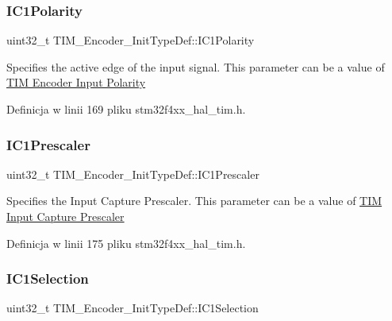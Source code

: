 \subsubsection{\texorpdfstring{I\+C1\+Polarity}{IC1Polarity}}
{\footnotesize\ttfamily uint32\+\_\+t T\+I\+M\+\_\+\+Encoder\+\_\+\+Init\+Type\+Def\+::\+I\+C1\+Polarity}

Specifies the active edge of the input signal. This parameter can be a value of \hyperlink{group___t_i_m___encoder___input___polarity}{T\+IM Encoder Input Polarity} 

Definicja w linii 169 pliku stm32f4xx\+\_\+hal\+\_\+tim.\+h.

\mbox{\label{struct_t_i_m___encoder___init_type_def_a56307eb4766e3f0e1cd1cd3c4fc2157e}} 
\subsubsection{\texorpdfstring{I\+C1\+Prescaler}{IC1Prescaler}}
{\footnotesize\ttfamily uint32\+\_\+t T\+I\+M\+\_\+\+Encoder\+\_\+\+Init\+Type\+Def\+::\+I\+C1\+Prescaler}

Specifies the Input Capture Prescaler. This parameter can be a value of \hyperlink{group___t_i_m___input___capture___prescaler}{T\+IM Input Capture Prescaler} 

Definicja w linii 175 pliku stm32f4xx\+\_\+hal\+\_\+tim.\+h.

\mbox{\label{struct_t_i_m___encoder___init_type_def_a85fbdebacff594ff1ad0d16eddfdc179}} 
\subsubsection{\texorpdfstring{I\+C1\+Selection}{IC1Selection}}
{\footnotesize\ttfamily uint32\+\_\+t T\+I\+M\+\_\+\+Encoder\+\_\+\+Init\+Type\+Def\+::\+I\+C1\+Selection}

